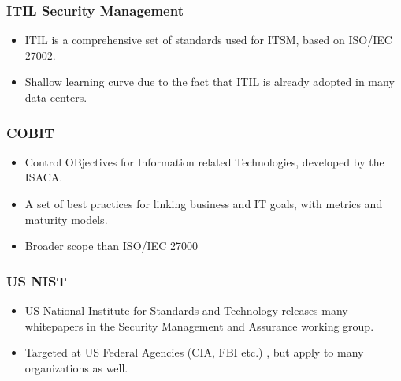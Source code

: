 \documentclass{article}
\begin{document}
\subsubsection{ITIL Security Management}
\begin{itemize}
    \item ITIL is a comprehensive set of standards used for ITSM, based on ISO/IEC 27002. 
    
    \item Shallow learning curve due to the fact that ITIL  is already adopted in many data centers. 
\end{itemize}

\subsubsection{COBIT}
\begin{itemize}
    \item Control OBjectives for Information related Technologies, developed by the ISACA.
    
    \item A set of best practices for linking business and IT goals, with metrics and maturity models. 
    
    \item Broader scope than ISO/IEC 27000
\end{itemize}

\subsubsection{US NIST}
\begin{itemize}
    \item US National Institute for Standards and Technology releases many whitepapers in the Security Management and Assurance working group. 
    
    \item Targeted at US Federal Agencies (CIA, FBI etc.) , but apply to many organizations as well. 
\end{itemize}
\end{document}
